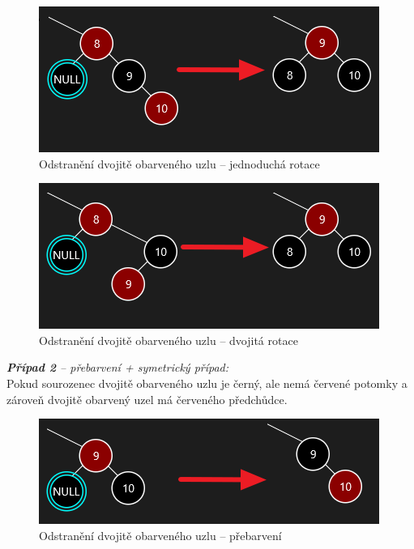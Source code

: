 \documentclass[
  biblatex=false,
  font=serif,
  glossaries=false,
  tables=false,
  theorems=false,
  index
]{kidiplom}
\begin{document}
\begin{figure}[h!]
\centering
	\includegraphics[scale=0.8]{obrazky/25Pripad1.png}
	\caption{Odstranění dvojitě obarveného uzlu -- jednoduchá rotace}
	\label{pripad1}
\end{figure}

\begin{figure}[h!]
\centering
	\includegraphics[scale=0.8]{obrazky/26Pripad1_2.png}
	\caption{Odstranění dvojitě obarveného uzlu -- dvojitá rotace}
	\label{pripad12}
\end{figure}

\newpage
\noindent \textit{\textbf{Případ 2} -- přebarvení + symetrický případ:}\\
Pokud sourozenec dvojitě obarveného uzlu je černý, ale nemá červené potomky a zároveň dvojitě obarvený uzel má červeného předchůdce.
\begin{figure}[h!]
\centering
	\includegraphics[scale=0.8]{obrazky/27Pripad2.png}
	\caption{Odstranění dvojitě obarveného uzlu -- přebarvení}
\end{figure}\\
\end{document}
